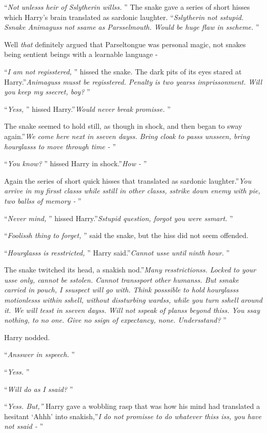 ``\emph{Not unlesss heir of Sslytherin willss.} '' The snake gave a series
of short hisses which Harry's brain translated as sardonic laughter.
``\emph{Sslytherin not sstupid. Ssnake Animaguss not ssame as
Parsselmouth. Would be huge flaw in sscheme.} ''

Well \emph{that} definitely argued that Parseltongue was personal magic,
not snakes being sentient beings with a learnable language -

``\emph{I am not regisstered,} '' hissed the snake. The dark pits of its
eyes stared at Harry.''\emph{Animaguss musst be regisstered. Penalty is
two yearss imprissonment. Will you keep my ssecret, boy?} ''

``\emph{Yess,} '' hissed Harry.''\emph{Would never break promisse.} ''

The snake seemed to hold still, as though in shock, and then began to
sway again.''\emph{We come here next in sseven dayss. Bring cloak to
passs unsseen, bring hourglasss to move through time -} ''

``\emph{You know?} '' hissed Harry in shock.''\emph{How -} ''

Again the series of short quick hisses that translated as sardonic
laughter.''\emph{You arrive in my firsst classs while sstill in other
classs, sstrike down enemy with pie, two ballss of memory -} ''

``\emph{Never mind,} '' hissed Harry.''\emph{Sstupid question, forgot you
were ssmart.} ''

``\emph{Foolissh thing to forget,} '' said the snake, but the hiss did not
seem offended.

``\emph{Hourglasss is resstricted,} '' Harry said.''\emph{Cannot usse
until ninth hour.} ''

The snake twitched its head, a snakish nod.''\emph{Many resstrictionss.
Locked to your usse only, cannot be sstolen. Cannot transsport other
humanss. But ssnake carried in pouch, I ssuspect will go with. Think
posssible to hold hourglasss motionlesss within sshell, without
dissturbing wardss, while you turn sshell around it. We will tesst in
sseven dayss. Will not sspeak of planss beyond thiss. You ssay nothing,
to no one. Give no ssign of expectancy, none. Undersstand?} ''

Harry nodded.

``\emph{Ansswer in sspeech.} ''

``\emph{Yess.} ''

``\emph{Will do as I ssaid?} ''

``\emph{Yess. But,''} Harry gave a wobbling rasp that was how his mind
had translated a hesitant `Ahhh' into snakish,''\emph{I do not promisse
to do whatever thiss iss, you have not ssaid -} ''

